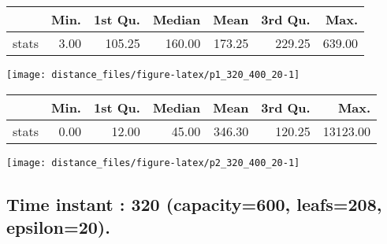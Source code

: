 \documentclass[
  9pt,
  landscape]{article}
\begin{document}
\begin{minipage}{0.5\textwidth} 
\centering 
\begin{tabular}{rrrrrrr}
  \hline
 & Min. & 1st Qu. & Median & Mean & 3rd Qu. & Max. \\ 
  \hline
stats & 3.00 & 105.25 & 160.00 & 173.25 & 229.25 & 639.00 \\ 
   \hline
\end{tabular}
\vspace{0.5cm} 


\texttt{[image: distance\_files/figure-latex/p1\_320\_400\_20-1]} 

\end{minipage} 
\begin{minipage}{0.5\textwidth} 
\centering 
\begin{tabular}{rrrrrrr}
  \hline
 & Min. & 1st Qu. & Median & Mean & 3rd Qu. & Max. \\ 
  \hline
stats & 0.00 & 12.00 & 45.00 & 346.30 & 120.25 & 13123.00 \\ 
   \hline
\end{tabular}
\vspace{0.5cm} 


\texttt{[image: distance\_files/figure-latex/p2\_320\_400\_20-1]} 

\end{minipage}

\pagebreak

\hypertarget{time-instant-320-capacity600-leafs208-epsilon20.}{%
\subsection{Time instant : 320 (capacity=600, leafs=208,
epsilon=20).}\label{time-instant-320-capacity600-leafs208-epsilon20.}}
\end{document}
